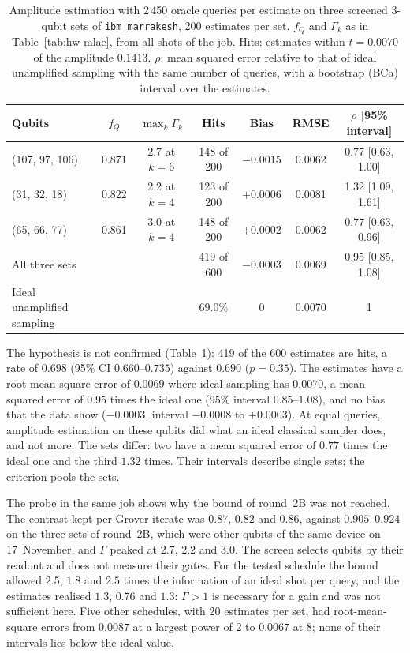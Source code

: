 \documentclass[11pt,a4paper]{article}
\begin{document}
\begin{table}[H]
\centering\footnotesize\setlength{\tabcolsep}{4pt}
\begin{tabular}{lcccccc}
\toprule
Qubits & $f_Q$ & $\max_k \Gamma_k$ & Hits & Bias & RMSE & $\rho$ [95\% interval] \\
\midrule
(107, 97, 106) & 0.871 & 2.7 at $k=6$ & 148 of 200 & $-0.0015$ & 0.0062 & 0.77 [0.63, 1.00] \\
(31, 32, 18) & 0.822 & 2.2 at $k=4$ & 123 of 200 & $+0.0006$ & 0.0081 & 1.32 [1.09, 1.61] \\
(65, 66, 77) & 0.861 & 3.0 at $k=4$ & 148 of 200 & $+0.0002$ & 0.0062 & 0.77 [0.63, 0.96] \\
\midrule
All three sets & & & 419 of 600 & $-0.0003$ & 0.0069 & 0.95 [0.85, 1.08] \\
Ideal unamplified sampling & & & 69.0\% & 0 & 0.0070 & 1 \\
\bottomrule
\end{tabular}
\caption{Amplitude estimation with 2\,450 oracle queries per estimate on
three screened 3-qubit sets of \texttt{ibm\_marrakesh}, 200 estimates per
set. $f_Q$ and $\Gamma_k$ as in Table~\ref{tab:hw-mlae}, from all shots of
the job. Hits: estimates within $t = 0.0070$ of the amplitude $0.1413$.
$\rho$: mean squared error relative to that of ideal unamplified sampling
with the same number of queries, with a bootstrap (BCa) interval over the
estimates.}
\label{tab:hw-ae}
\end{table}

The hypothesis is not confirmed (Table~\ref{tab:hw-ae}): 419 of the 600
estimates are hits, a rate of $0.698$ (95\% CI $0.660$--$0.735$) against
$0.690$ ($p = 0.35$). The estimates have a root-mean-square error of
$0.0069$ where ideal sampling has $0.0070$, a mean squared error of $0.95$
times the ideal one (95\% interval $0.85$--$1.08$), and no bias that the
data show ($-0.0003$, interval $-0.0008$ to $+0.0003$). At equal queries,
amplitude estimation on these qubits did what an ideal classical sampler
does, and not more. The sets differ: two have a mean squared error of
$0.77$ times the ideal one and the third $1.32$ times. Their intervals
describe single sets; the criterion pools the sets.

The probe in the same job shows why the bound of round~2B was not reached.
The contrast kept per Grover iterate was $0.87$, $0.82$ and $0.86$, against
$0.905$--$0.924$ on the three sets of round~2B, which were other qubits of
the same device on 17~November, and $\Gamma$ peaked at $2.7$, $2.2$ and
$3.0$. The screen selects qubits by their readout and does not measure
their gates. For the tested schedule the bound allowed $2.5$, $1.8$ and
$2.5$ times the information of an ideal shot per query, and the estimates
realised $1.3$, $0.76$ and $1.3$: $\Gamma > 1$ is necessary for a gain and
was not sufficient here. Five other schedules, with 20 estimates per set,
had root-mean-square errors from $0.0087$ at a largest power of 2 to
$0.0067$ at 8; none of their intervals lies below the ideal value.
\end{document}
